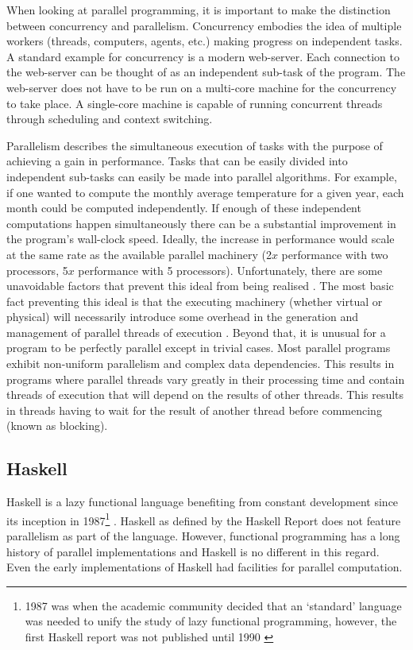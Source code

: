 When looking at parallel programming, it is important to make the distinction
between concurrency and parallelism.  Concurrency embodies the idea of multiple
workers (threads, computers, agents, etc.) making progress on independent
tasks. A standard example for concurrency is a modern web-server. Each
connection to the web-server can be thought of as an independent sub-task of
the program. The web-server does not have to be run on a multi-core machine for
the concurrency to take place. A single-core machine is capable of running
concurrent threads through scheduling and context switching.

Parallelism describes the simultaneous execution of tasks with the purpose of
achieving a gain in performance. Tasks that can be easily divided into
independent sub-tasks can easily be made into parallel algorithms. For example,
if one wanted to compute the monthly average temperature for a given year, each
month could be computed independently.  If enough of these independent
computations happen simultaneously there can be a substantial improvement in
the program's wall-clock speed. Ideally, the increase in performance would
scale at the same rate as the available parallel machinery (2$x$ performance
with two processors, 5$x$ performance with 5 processors). Unfortunately, there
are some unavoidable factors that prevent this ideal from being realised
\citep{hughes:thesis,HistoryOfHaskell,PFPAnIntro}. The most basic fact
preventing this ideal is that the executing machinery (whether virtual or
physical) will necessarily introduce some overhead in the generation and
management of parallel threads of execution \citep{PeytonJones:IFL}. Beyond
that, it is unusual for a program to be perfectly parallel except in trivial
cases. Most parallel programs exhibit non-uniform parallelism and complex data
dependencies. This results in programs where parallel threads vary greatly in
their processing time and contain threads of execution that will depend on the
results of other threads. This results in threads having to wait for the result
of another thread before commencing (known as blocking).

\subsection{Haskell}

Haskell is a lazy functional language benefiting from constant development
since its inception in 1987\footnote{1987 was when the academic community
decided that an `standard' language was needed to unify the study of lazy
functional programming\citep{HistoryOfHaskell}, however, the first Haskell
report was not published until 1990 \citep{Haskell98Book}}
\citep{HistoryOfHaskell, Haskell98Book}. Haskell as defined by the Haskell
Report \citep{Haskell98Book} does not feature parallelism as part of the language.
However, functional programming has a long history of parallel implementations
and Haskell is no different in this regard. Even the early implementations of
Haskell had facilities for parallel computation.

